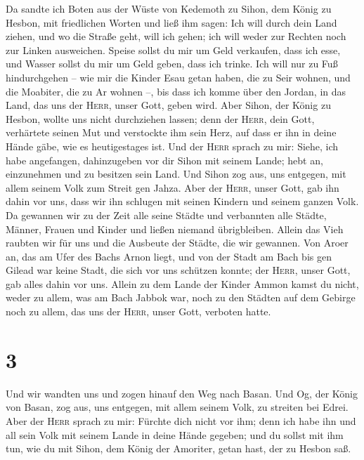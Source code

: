  Da sandte ich Boten aus der Wüste von Kedemoth zu Sihon,
dem König zu Hesbon, mit friedlichen Worten und ließ ihm sagen:
 Ich will durch dein Land ziehen, und wo die Straße geht,
will ich gehen; ich will weder zur Rechten noch zur Linken ausweichen.
 Speise sollst du mir um Geld verkaufen, dass ich esse,
und Wasser sollst du mir um Geld geben, dass ich trinke. Ich will nur zu
Fuß hindurchgehen --  wie mir die Kinder Esau getan
haben, die zu Seir wohnen, und die Moabiter, die zu Ar wohnen --, bis
dass ich komme über den Jordan, in das Land, das uns der \textsc{Herr},
unser Gott, geben wird.  Aber Sihon, der König zu Hesbon,
wollte uns nicht durchziehen lassen; denn der \textsc{Herr}, dein Gott,
verhärtete seinen Mut und verstockte ihm sein Herz, auf dass er ihn in
deine Hände gäbe, wie es heutigestages ist.  Und der
\textsc{Herr} sprach zu mir: Siehe, ich habe angefangen, dahinzugeben
vor dir Sihon mit seinem Lande; hebt an, einzunehmen und zu besitzen
sein Land.  Und Sihon zog aus, uns entgegen, mit allem
seinem Volk zum Streit gen Jahza.  Aber der
\textsc{Herr}, unser Gott, gab ihn dahin vor uns, dass wir ihn schlugen
mit seinen Kindern und seinem ganzen Volk.  Da gewannen
wir zu der Zeit alle seine Städte und verbannten alle Städte, Männer,
Frauen und Kinder und ließen niemand übrigbleiben. 
Allein das Vieh raubten wir für uns und die Ausbeute der Städte, die wir
gewannen.  Von Aroer an, das am Ufer des Bachs Arnon
liegt, und von der Stadt am Bach bis gen Gilead war keine Stadt, die
sich vor uns schützen konnte; der \textsc{Herr}, unser Gott, gab alles
dahin vor uns.  Allein zu dem Lande der Kinder Ammon
kamst du nicht, weder zu allem, was am Bach Jabbok war, noch zu den
Städten auf dem Gebirge noch zu allem, das uns der \textsc{Herr}, unser
Gott, verboten hatte.

\hypertarget{section-2}{%
\section{3}\label{section-2}}

 Und wir wandten uns und zogen hinauf den Weg nach Basan.
Und Og, der König von Basan, zog aus, uns entgegen, mit allem seinem
Volk, zu streiten bei Edrei.  Aber der \textsc{Herr}
sprach zu mir: Fürchte dich nicht vor ihm; denn ich habe ihn und all
sein Volk mit seinem Lande in deine Hände gegeben; und du sollst mit ihm
tun, wie du mit Sihon, dem König der Amoriter, getan hast, der zu Hesbon
saß.

